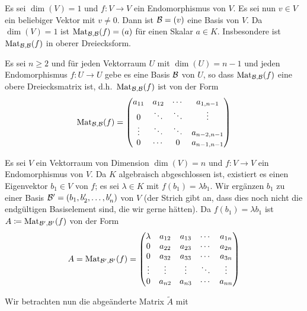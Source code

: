 \documentclass[a4paper,10pt]{scrartcl}
\begin{document}
\begin{ib}
 Es sei $\dim(V) = 1$ und $f \colon V \to V$ ein Endomorphismus von $V$. Es sei nun $v \in V$ ein beliebiger Vektor mit $v \neq 0$. Dann ist $\mathcal{B} = (v)$ eine Basis von $V$. Da $\dim(V) = 1$ ist $\mathrm{Mat}_{\mathcal{B},\mathcal{B}}(f) = (a)$ für einen Skalar $a \in K$. Insbesondere ist $\mathrm{Mat}_{\mathcal{B},\mathcal{B}}(f)$ in oberer Dreiecksform.
\end{ib}
\begin{iv}
 Es sei $n \geq 2$ und für jeden Vektorraum $U$ mit $\dim(U) = n-1$ und jeden Endomorphismus $f \colon U \to U$ gebe es eine Basis $\mathcal{B}$ von $U$, so dass $\mathrm{Mat}_{\mathcal{B},\mathcal{B}}(f)$ eine obere Dreiecksmatrix ist, d.h.\ $\mathrm{Mat}_{\mathcal{B},\mathcal{B}}(f)$ ist von der Form
 \[
  \mathrm{Mat}_{\mathcal{B},\mathcal{B}}(f)
  =
  \begin{pmatrix}
  a_{11} & a_{12} & \cdots & a_{1,n-1}   \\
  0      & \ddots & \ddots & \vdots      \\
  \vdots & \ddots & \ddots & a_{n-2,n-1} \\
  0      & \cdots & 0      & a_{n-1,n-1}
 \end{pmatrix}
 \]
\end{iv}
\begin{is}
 Es sei $V$ ein Vektorraum von Dimension $\dim(V) = n$ und $f \colon V \to V$ ein Endomorphismus von $V$. Da $K$ algebraisch abgeschlossen ist, existiert es einen Eigenvektor $b_1 \in V$ von $f$; es sei $\lambda \in K$ mit $f(b_1) = \lambda b_1$. Wir ergänzen $b_1$ zu einer Basis $\mathcal{B}' = (b_1, b_2', \dotsc, b_n')$ von $V$ (der Strich gibt an, dass dies noch nicht die endgültigen Basiselement sind, die wir gerne hätten). Da $f(b_1) = \lambda b_1$ ist $A \coloneqq \mathrm{Mat}_{\mathcal{B}',\mathcal{B}'}(f)$ von der Form
 \begin{equation}\label{eqn: matrix representation of f}
  A
  = \mathrm{Mat}_{\mathcal{B}',\mathcal{B}'}(f)
  =
  \begin{pmatrix}
   \lambda & a_{12} & a_{13} & \cdots & a_{1n} \\
   0       & a_{22} & a_{23} & \cdots & a_{2n} \\
   0       & a_{32} & a_{33} & \cdots & a_{3n} \\
   \vdots  & \vdots & \vdots & \ddots & \vdots \\
   0       & a_{n2} & a_{n3} & \cdots & a_{nn}
  \end{pmatrix}
 \end{equation}
\end{is}
Wir betrachten nun die abgeänderte Matrix $\tilde{A}$ mit
\end{document}
